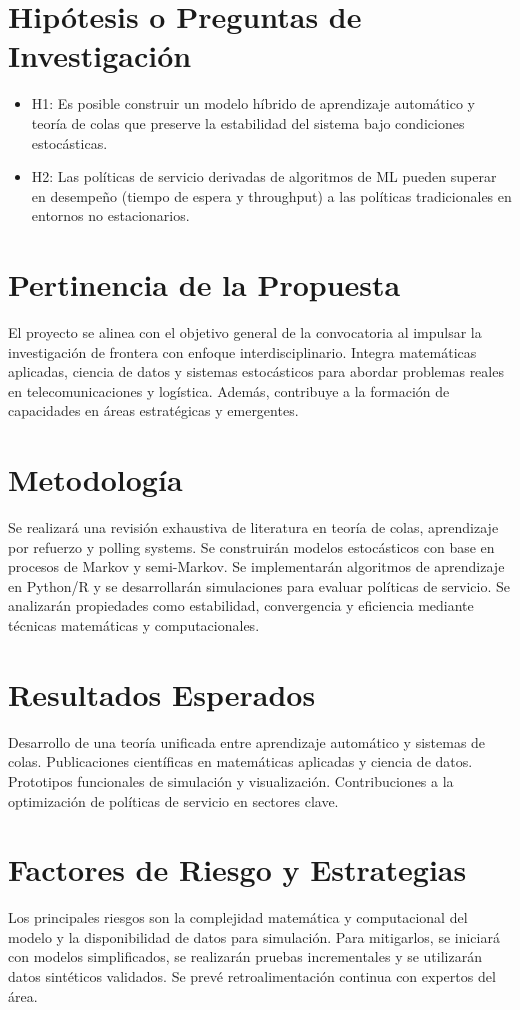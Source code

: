 \documentclass[12pt]{article}
\begin{document}
\section*{Hipótesis o Preguntas de Investigación}
\begin{itemize}
  \item H1: Es posible construir un modelo híbrido de aprendizaje automático y teoría de colas que preserve la estabilidad del sistema bajo condiciones estocásticas.
  \item H2: Las políticas de servicio derivadas de algoritmos de ML pueden superar en desempeño (tiempo de espera y throughput) a las políticas tradicionales en entornos no estacionarios.
\end{itemize}

\section*{Pertinencia de la Propuesta}
El proyecto se alinea con el objetivo general de la convocatoria al impulsar la investigación de frontera con enfoque interdisciplinario. Integra matemáticas aplicadas, ciencia de datos y sistemas estocásticos para abordar problemas reales en telecomunicaciones y logística. Además, contribuye a la formación de capacidades en áreas estratégicas y emergentes.

\section*{Metodología}
Se realizará una revisión exhaustiva de literatura en teoría de colas, aprendizaje por refuerzo y polling systems. Se construirán modelos estocásticos con base en procesos de Markov y semi-Markov. Se implementarán algoritmos de aprendizaje en Python/R y se desarrollarán simulaciones para evaluar políticas de servicio. Se analizarán propiedades como estabilidad, convergencia y eficiencia mediante técnicas matemáticas y computacionales.

\section*{Resultados Esperados}
Desarrollo de una teoría unificada entre aprendizaje automático y sistemas de colas. Publicaciones científicas en matemáticas aplicadas y ciencia de datos. Prototipos funcionales de simulación y visualización. Contribuciones a la optimización de políticas de servicio en sectores clave.

\section*{Factores de Riesgo y Estrategias}
Los principales riesgos son la complejidad matemática y computacional del modelo y la disponibilidad de datos para simulación. Para mitigarlos, se iniciará con modelos simplificados, se realizarán pruebas incrementales y se utilizarán datos sintéticos validados. Se prevé retroalimentación continua con expertos del área.
\end{document}
